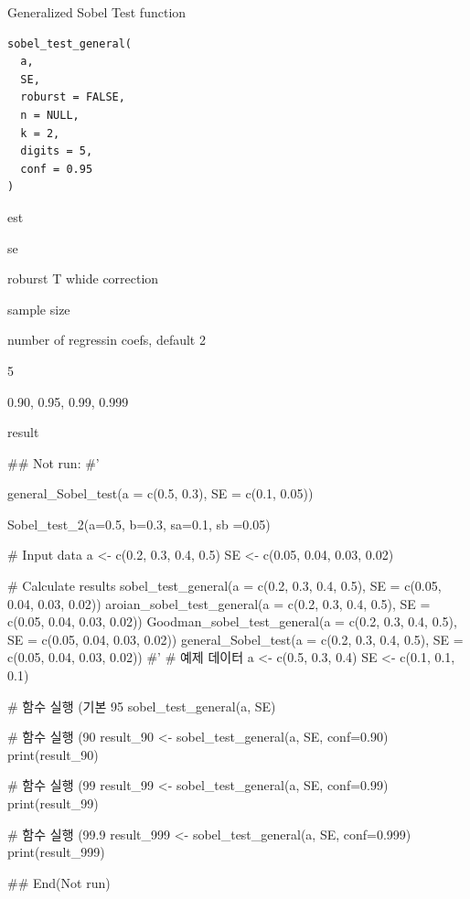 \documentclass[a4paper]{book}
\begin{document}
%
\begin{Description}
Generalized Sobel Test function
\end{Description}
%
\begin{Usage}
\begin{verbatim}
sobel_test_general(
  a,
  SE,
  roburst = FALSE,
  n = NULL,
  k = 2,
  digits = 5,
  conf = 0.95
)
\end{verbatim}
\end{Usage}
%
\begin{Arguments}
\begin{ldescription}
\item[\code{a}] est

\item[\code{SE}] se

\item[\code{roburst}] roburst T whide correction

\item[\code{n}] sample size

\item[\code{k}] number of regressin coefs, default 2

\item[\code{digits}] 5

\item[\code{conf}] 0.90, 0.95, 0.99, 0.999
\end{ldescription}
\end{Arguments}
%
\begin{Value}
result
\end{Value}
%
\begin{Examples}
\begin{ExampleCode}

\#\# Not run: 
#'

general_Sobel_test(a = c(0.5, 0.3), SE = c(0.1, 0.05))

Sobel_test_2(a=0.5, b=0.3, sa=0.1, sb =0.05)

# Input data
a <- c(0.2, 0.3, 0.4, 0.5)
SE <- c(0.05, 0.04, 0.03, 0.02)

# Calculate results
sobel_test_general(a = c(0.2, 0.3, 0.4, 0.5), SE = c(0.05, 0.04, 0.03, 0.02))
aroian_sobel_test_general(a = c(0.2, 0.3, 0.4, 0.5), SE = c(0.05, 0.04, 0.03, 0.02))
Goodman_sobel_test_general(a = c(0.2, 0.3, 0.4, 0.5), SE = c(0.05, 0.04, 0.03, 0.02))
general_Sobel_test(a = c(0.2, 0.3, 0.4, 0.5), SE = c(0.05, 0.04, 0.03, 0.02))
#'
# 예제 데이터
a <- c(0.5, 0.3, 0.4)
SE <- c(0.1, 0.1, 0.1)

# 함수 실행 (기본 95%
sobel_test_general(a, SE)

# 함수 실행 (90%
result_90 <- sobel_test_general(a, SE, conf=0.90)
print(result_90)

# 함수 실행 (99%
result_99 <- sobel_test_general(a, SE, conf=0.99)
print(result_99)

# 함수 실행 (99.9%
result_999 <- sobel_test_general(a, SE, conf=0.999)
print(result_999)


## End(Not run)


\end{ExampleCode}
\end{Examples}
\end{document}
